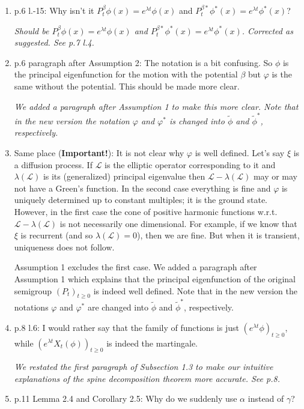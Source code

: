 \documentclass[12pt,a4paper]{amsart}
\numberwithin{equation}{section}
\theoremstyle{plain}
\theoremstyle{definition}
\begin{document}
\begin{enumerate}
  {\it We added a new sentence there which gives the function $\beta$. See p.5 l.-10.}
\item
  p.6 l.-15: Why isn't it $P_t^\beta \phi(x) = e^{\lambda t}\phi(x)$ and $P_t^{\beta*} \phi^*(x) = e^{\lambda t}\phi^*(x)$?

  {\it Should be $P_t^\beta \phi(x) = e^{\lambda t}\phi(x)$ and $P_t^{\beta*} \phi^*(x) = e^{\lambda t}\phi^*(x)$. Corrected as suggested. See p.7 l.4.}
\item
  p.6 paragraph after Assumption 2: The notation is a bit confusing. So $\phi$ is the principal eigenfunction for the motion with the potential $\beta$ but $\varphi$ is the same without the potential.
  This should be made more clear.

  {\it We added a paragraph after Assumption 1 to make this more clear.
    Note that in the new version the notation $\varphi$ and $\varphi^*$ is changed into $\widetilde \phi$ and $\widetilde \phi^*$, respectively.}
\item
  Same place ({\bf Important!}): It is not clear why $\varphi$ is well defined.
  Let's say $\xi$ is a diffusion process.
  If $\mathcal L$ is the elliptic operator corresponding to it and $\lambda(\mathcal L)$ is its (generalized) principal eigenvalue then $\mathcal L - \lambda(\mathcal L)$ may or may not have a Green's function.
  In the second case everything is fine and $\varphi$ is uniquely determined up to constant multiples; it is the ground state.
  However, in the first case the cone of positive harmonic functions w.r.t. $\mathcal L - \lambda(\mathcal L)$ is not necessarily one dimensional.
  For example, if we know that $\xi$ is recurrent (and so $\lambda(\mathcal L) = 0$), then we are fine.
  But when it is transient, uniqueness does not follow.

  {\it 
 
  Assumption 1 excludes the first case. We added a paragraph after Assumption 1
  which explains that the principal eigenfunction of the original semigroup $(P_t)_{t\ge0}$ is indeed well defined.
    Note that in the new version the notations $\varphi$ and $\varphi^*$ are changed into $\widetilde \phi$ and $\widetilde \phi^*$, respectively.}
\item
  p.8 l.6: I would rather say that the family of functions is just $(e^{\lambda t} \phi)_{t\geq 0}$, while $(e^{\lambda t} X_t(\phi))_{t\geq 0}$ is indeed the martingale.

  {\it We restated the first paragraph of Subsection 1.3 to make our intuitive explanations of the spine decomposition theorem more accurate. See p.8. }
\item
  p.11 Lemma 2.4 and Corollary 2.5:
  Why do we suddenly use $\alpha$ instead of $\gamma$?


\end{enumerate}
\end{document}

